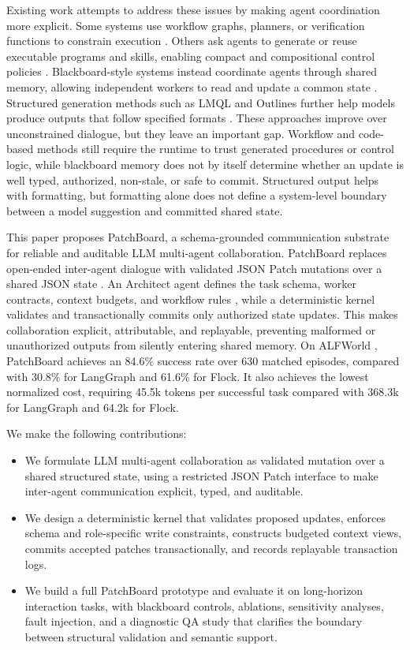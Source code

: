 \documentclass[11pt]{article}
\newcommand{\method}{PatchBoard}
\begin{document}
Existing work attempts to address these issues by making agent coordination more explicit. Some systems use workflow graphs, planners, or verification functions to constrain execution \citep{langgraph2024,zhang2024aflow}. Others ask agents to generate or reuse executable programs and skills, enabling compact and compositional control policies \citep{wang2023voyager,yang2025codeagents}. Blackboard-style systems instead coordinate agents through shared memory, allowing independent workers to read and update a common state \citep{hayesroth1985blackboard,salemi2025blackboard}. Structured generation methods such as LMQL and Outlines further help models produce outputs that follow specified formats \citep{beurer2023prompting,willard2023outlines}. These approaches improve over unconstrained dialogue, but they leave an important gap. Workflow and code-based methods still require the runtime to trust generated procedures or control logic, while blackboard memory does not by itself determine whether an update is well typed, authorized, non-stale, or safe to commit. Structured output helps with formatting, but formatting alone does not define a system-level boundary between a model suggestion and committed shared state.

This paper proposes \method{}, a schema-grounded communication substrate for reliable and auditable LLM multi-agent collaboration. \method{} replaces open-ended inter-agent dialogue with validated JSON Patch mutations over a shared JSON state \citep{bryan2013rfc}. An Architect agent defines the task schema, worker contracts, context budgets, and workflow rules \citep{bourhis2017json}, while a deterministic kernel validates and transactionally commits only authorized state updates. This makes collaboration explicit, attributable, and replayable, preventing malformed or unauthorized outputs from silently entering shared memory. On ALFWorld \citep{shridhar2021alfworld}, \method{} achieves an 84.6\% success rate over 630 matched episodes, compared with 30.8\% for LangGraph and 61.6\% for Flock. It also achieves the lowest normalized cost, requiring 45.5k tokens per successful task compared with 368.3k for LangGraph and 64.2k for Flock.

We make the following contributions:
\begin{itemize}[leftmargin=*]
    \item We formulate LLM multi-agent collaboration as validated mutation over a shared structured state, using a restricted JSON Patch interface to make inter-agent communication explicit, typed, and auditable.

    \item We design a deterministic kernel that validates proposed updates, enforces schema and role-specific write constraints, constructs budgeted context views, commits accepted patches transactionally, and records replayable transaction logs.

    \item We build a full \method{} prototype and evaluate it on long-horizon interaction tasks, with blackboard controls, ablations, sensitivity analyses, fault injection, and a diagnostic QA study that clarifies the boundary between structural validation and semantic support.
\end{itemize}
\end{document}

